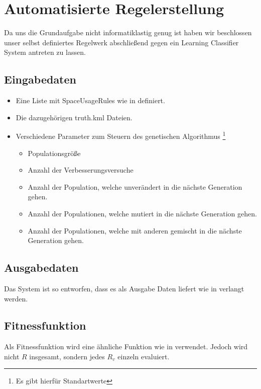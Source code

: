 \section{Automatisierte Regelerstellung}
Da uns die Grundaufgabe nicht informatiklastig genug ist
haben wir beschlossen unser selbst definiertes Regelwerk abschließend gegen ein Learning Classifier System antreten zu lassen.


\subsection{Eingabedaten}
\begin{itemize}
\item Eine Liste mit SpaceUsageRules wie in  definiert.
\item Die dazugehörigen truth.kml Dateien.
\item Verschiedene Parameter zum Steuern des genetischen Algorithmus
\footnote{Es gibt hierfür Standartwerte}
  \begin{itemize}
  \item Populationsgröße
  \item Anzahl der Verbesserungsversuche
  \item Anzahl der Population, welche unverändert in die nächste Generation gehen.
  \item Anzahl der Populationen, welche mutiert in die nächste Generation gehen.
  \item Anzahl der Populationen, welche mit anderen gemischt in die nächste Generation gehen.
  \end{itemize}
\end{itemize}
\subsection{Ausgabedaten}
Das System ist so entworfen, dass es als Ausgabe Daten liefert wie in  verlangt werden.
\subsection{Fitnessfunktion}
Als Fitnessfunktion wird eine ähnliche Funktion wie in  verwendet. Jedoch wird nicht $R$ insgesamt, sondern jedes $R_v$ einzeln evaluiert.
